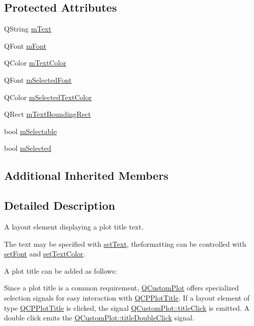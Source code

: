 \subsection*{Protected Attributes}
\begin{DoxyCompactItemize}
\item 
Q\+String \hyperlink{classQCPPlotTitle_a0d961bfac1211d59d3b0bc30d35f6379}{m\+Text}
\item 
Q\+Font \hyperlink{classQCPPlotTitle_ad9e2c2a2e941f3444cb692a51df0df62}{m\+Font}
\item 
Q\+Color \hyperlink{classQCPPlotTitle_a5d7f834d6522c1a72fb0682c0b7ebe13}{m\+Text\+Color}
\item 
Q\+Font \hyperlink{classQCPPlotTitle_a95003186c39bbab902873a8ef4cbb547}{m\+Selected\+Font}
\item 
Q\+Color \hyperlink{classQCPPlotTitle_a8b9760e62af92814c4effdd7ad69c5f9}{m\+Selected\+Text\+Color}
\item 
Q\+Rect \hyperlink{classQCPPlotTitle_a7178a0f6c1e633c144c17b4de4e0b840}{m\+Text\+Bounding\+Rect}
\item 
bool \hyperlink{classQCPPlotTitle_aadefb5e2b19b1cc7deda0a55ec747884}{m\+Selectable}
\item 
bool \hyperlink{classQCPPlotTitle_afef1342a20f5ca985a20b9cfdc03d815}{m\+Selected}
\end{DoxyCompactItemize}
\subsection*{Additional Inherited Members}


\subsection{Detailed Description}
A layout element displaying a plot title text. 

The text may be specified with \hyperlink{classQCPPlotTitle_aae5a93e88050dfb2cbf6adc087516821}{set\+Text}, theformatting can be controlled with \hyperlink{classQCPPlotTitle_a199fc7170802ea65006c371875349e37}{set\+Font} and \hyperlink{classQCPPlotTitle_a71273e3a0ca6b4c151591b37b9e5ce33}{set\+Text\+Color}.

A plot title can be added as follows\+: 
\begin{DoxyCodeInclude}
\end{DoxyCodeInclude}
 Since a plot title is a common requirement, \hyperlink{classQCustomPlot}{Q\+Custom\+Plot} offers specialized selection signals for easy interaction with \hyperlink{classQCPPlotTitle}{Q\+C\+P\+Plot\+Title}. If a layout element of type \hyperlink{classQCPPlotTitle}{Q\+C\+P\+Plot\+Title} is clicked, the signal \hyperlink{classQCustomPlot_a2137a819e518fee7edd1c0bf5984d8d6}{Q\+Custom\+Plot\+::title\+Click} is emitted. A double click emits the \hyperlink{classQCustomPlot_ad51d65f6abf5edfaeef6e0519a4c1a2f}{Q\+Custom\+Plot\+::title\+Double\+Click} signal. 

